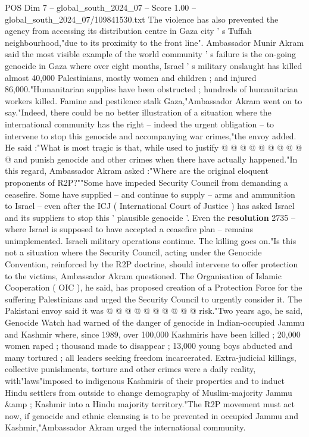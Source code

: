 \begin{textsample}{POS Dim 7 – global\_south\_2024\_07 – Score 1.00 – global\_south\_2024\_07/109841530.txt}
The violence has also prevented the agency from accessing its distribution centre in Gaza city ' s Tuffah neighbourhood,"due to its proximity to the front line".
Ambassador Munir Akram said the most visible example of the world community ' s failure is the on-going genocide in Gaza where over eight months, Israel ' s military onslaught has killed almost 40,000 Palestinians, mostly women and children ; and injured 86,000."Humanitarian supplies have been obstructed ; hundreds of humanitarian workers killed.
Famine and pestilence stalk Gaza,"Ambassador Akram went on to say."Indeed, there could be no better illustration of a situation where the international community has the right -- indeed the urgent obligation -- to intervene to stop this genocide and accompanying war crimes,"the envoy added.
He said :"What is most tragic is that, while used to justify @ @ @ @ @ @ @ @ @ @ and punish genocide and other crimes when there have actually happened."In this regard, Ambassador Akram asked :"Where are the original eloquent proponents of R2P?""Some have impeded Security Council from demanding a ceasefire.
Some have supplied -- and continue to supply -- arms and ammunition to Israel -- even after the ICJ ( International Court of Justice ) has asked Israel and its suppliers to stop this ' plausible genocide '.
Even the \textbf{resolution} 2735 -- where Israel is supposed to have accepted a ceasefire plan -- remains unimplemented.
Israeli military operations continue.
The killing goes on."Is this not a situation where the Security Council, acting under the Genocide Convention, reinforced by the R2P doctrine, should intervene to offer protection to the victims, Ambassador Akram questioned.
The Organisation of Islamic Cooperation ( OIC ), he said, has proposed creation of a Protection Force for the suffering Palestinians and urged the Security Council to urgently consider it.
The Pakistani envoy said it was @ @ @ @ @ @ @ @ @ @ risk."Two years ago, he said, Genocide Watch had warned of the danger of genocide in Indian-occupied Jammu and Kashmir where, since 1989, over 100,000 Kashmiris have been killed ; 20,000 women raped ; thousand made to disappear ; 13,000 young boys abducted and many tortured ; all leaders seeking freedom incarcerated.
Extra-judicial killings, collective punishments, torture and other crimes were a daily reality, with"laws"imposed to indigenous Kashmiris of their properties and to induct Hindu settlers from outside to change demography of Muslim-majority Jammu \&amp ; Kashmir into a Hindu majority territory."The R2P movement must act now, if genocide and ethnic cleansing is to be prevented in occupied Jammu and Kashmir,"Ambassador Akram urged the international community.

\end{textsample}
